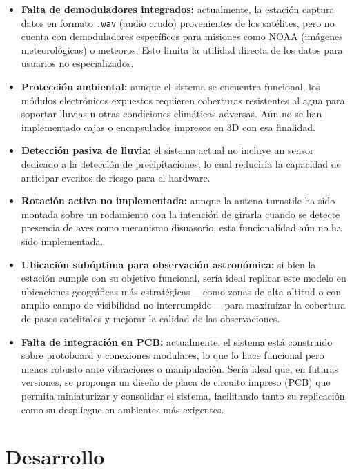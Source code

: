 \documentclass[conference]{IEEEtran}
\begin{document}
\begin{itemize}
    \item \textbf{Falta de demoduladores integrados:} actualmente, la estación captura datos en formato \texttt{.wav} (audio crudo) provenientes de los satélites, pero no cuenta con demoduladores específicos para misiones como NOAA (imágenes meteorológicas) o meteoros. Esto limita la utilidad directa de los datos para usuarios no especializados.
    
    \item \textbf{Protección ambiental:} aunque el sistema se encuentra funcional, los módulos electrónicos expuestos requieren coberturas resistentes al agua para soportar lluvias u otras condiciones climáticas adversas. Aún no se han implementado cajas o encapsulados impresos en 3D con esa finalidad.
    
    \item \textbf{Detección pasiva de lluvia:} el sistema actual no incluye un sensor dedicado a la detección de precipitaciones, lo cual reduciría la capacidad de anticipar eventos de riesgo para el hardware.
    
    \item \textbf{Rotación activa no implementada:} aunque la antena turnstile ha sido montada sobre un rodamiento con la intención de girarla cuando se detecte presencia de aves como mecanismo disuasorio, esta funcionalidad aún no ha sido implementada.
    
    \item \textbf{Ubicación subóptima para observación astronómica:} si bien la estación cumple con su objetivo funcional, sería ideal replicar este modelo en ubicaciones geográficas más estratégicas —como zonas de alta altitud o con amplio campo de visibilidad no interrumpido— para maximizar la cobertura de pasos satelitales y mejorar la calidad de las observaciones.
    
    \item \textbf{Falta de integración en PCB:} actualmente, el sistema está construido sobre protoboard y conexiones modulares, lo que lo hace funcional pero menos robusto ante vibraciones o manipulación. Sería ideal que, en futuras versiones, se proponga un diseño de placa de circuito impreso (PCB) que permita miniaturizar y consolidar el sistema, facilitando tanto su replicación como su despliegue en ambientes más exigentes.
\end{itemize}



\section{Desarrollo}
\end{document}

